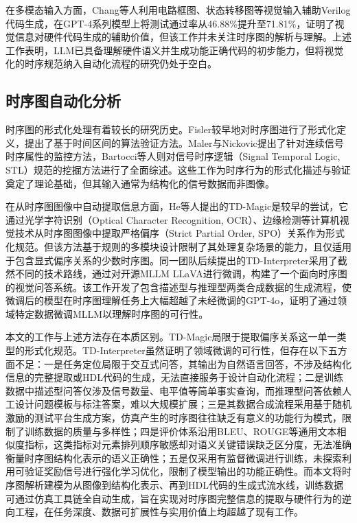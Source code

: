在多模态输入方面，Chang等人利用电路框图、状态转移图等视觉输入辅助Verilog代码生成，在GPT-4系列模型上将测试通过率从46.88\%提升至71.81\%，证明了视觉信息对硬件代码生成的辅助价值，但该工作并未关注时序图的解析与理解。上述工作表明，LLM已具备理解硬件语义并生成功能正确代码的初步能力，但将视觉化的时序规范纳入自动化流程的研究仍处于空白。

\subsection{时序图自动化分析}

时序图的形式化处理有着较长的研究历史。Fisler较早地对时序图进行了形式化定义，提出了基于时间区间的算法验证方法。Maler与Nickovic提出了针对连续信号时序属性的监控方法，Bartocci等人则对信号时序逻辑（Signal Temporal Logic, STL）规范的挖掘方法进行了全面综述。这些工作为时序行为的形式化描述与验证奠定了理论基础，但其输入通常为结构化的信号数据而非图像。

在从时序图图像中自动提取信息方面，He等人提出的TD-Magic是较早的尝试，它通过光学字符识别（Optical Character Recognition, OCR）、边缘检测等计算机视觉技术从时序图图像中提取严格偏序（Strict Partial Order, SPO）关系作为形式化规范。但该方法基于规则的多模块设计限制了其处理复杂场景的能力，且仅适用于包含显式偏序关系的少数时序图。同一团队后续提出的TD-Interpreter采用了截然不同的技术路线，通过对开源MLLM LLaVA进行微调，构建了一个面向时序图的视觉问答系统。该工作开发了包含描述型与推理型两类合成数据的生成流程，使微调后的模型在时序图理解任务上大幅超越了未经微调的GPT-4o，证明了通过领域特定数据微调MLLM以理解时序图的可行性。

本文的工作与上述方法存在本质区别。TD-Magic局限于提取偏序关系这一单一类型的形式化规范。TD-Interpreter虽然证明了领域微调的可行性，但存在以下五方面不足：一是任务定位局限于交互式问答，其输出为自然语言回答，不涉及结构化信息的完整提取或HDL代码的生成，无法直接服务于设计自动化流程；二是训练数据中描述型问答仅涉及信号数量、电平值等简单事实查询，而推理型问答依赖人工设计问题模板与标注答案，难以大规模扩展；三是其数据合成流程采用基于随机激励的测试平台生成方案，仿真产生的时序图往往缺乏有意义的功能行为模式，限制了训练数据的质量与多样性；四是评价体系沿用BLEU、ROUGE等通用文本相似度指标，这类指标对元素排列顺序敏感却对语义关键错误缺乏区分度，无法准确衡量时序图结构化表示的语义正确性；五是仅采用有监督微调进行训练，未探索利用可验证奖励信号进行强化学习优化，限制了模型输出的功能正确性。而本文将时序图解析建模为从图像到结构化表示、再到HDL代码的生成式流水线，训练数据可通过仿真工具链全自动生成，旨在实现对时序图完整信息的提取与硬件行为的逆向工程，在任务深度、数据可扩展性与实用价值上均超越了现有工作。


